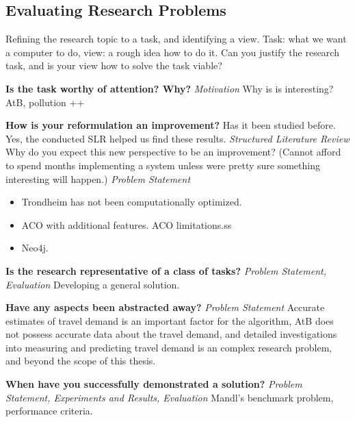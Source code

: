 \subsection{Evaluating Research Problems}

Refining the research topic to a task, and identifying a view.
Task: what we want a computer to do, view: a rough idea how to do it. Can you justify the research task, and is your view how to solve the task viable? 

\textbf{Is the task worthy of attention? Why?}
\emph{\color{orange} Motivation}
Why is is interesting? AtB, pollution ++ 

\textbf{How is your reformulation an improvement?}
Has it been studied before. Yes, the conducted SLR helped us find these results.\emph{\color{orange} Structured Literature Review}
Why do you expect this new perspective to be an improvement? (Cannot afford to spend months implementing a system unless were pretty sure something interesting will happen.)\emph{\color{orange} Problem Statement}
\begin{itemize}
\item Trondheim has not been computationally optimized.
\item ACO with additional features. ACO limitations.ss
\item Neo4j.
\end{itemize}

\textbf{Is the research representative of a class of tasks?}
\emph{\color{orange} Problem Statement, Evaluation}
Developing a general solution.

\textbf{Have any aspects been abstracted away?}
\emph{\color{orange} Problem Statement}
Accurate estimates of travel demand is an important factor for the algorithm, AtB does not possess accurate data about the travel demand, and detailed investigations into measuring and predicting travel demand is an complex research problem, and beyond the scope of this thesis. 

\textbf{When have you successfully demonstrated a solution?}
\emph{\color{orange} Problem Statement, Experiments and Results, Evaluation}
Mandl's benchmark problem, performance criteria.